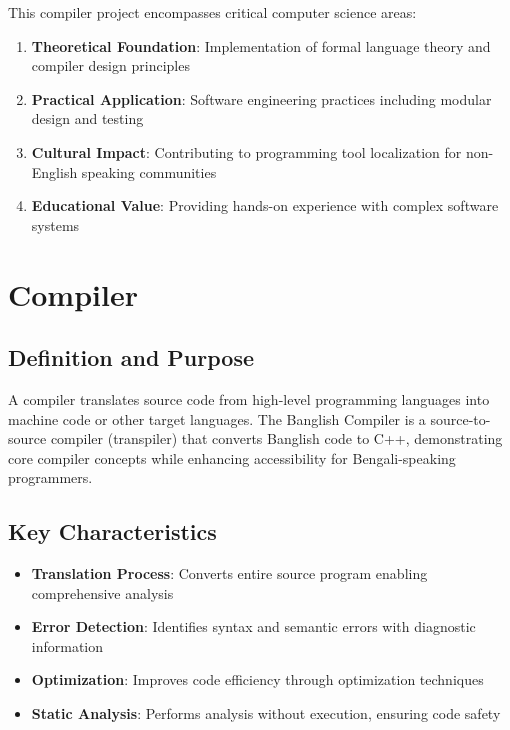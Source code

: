 \documentclass[12pt,a4paper]{article}
\begin{document}
This compiler project encompasses critical computer science areas:

\begin{enumerate}[leftmargin=*,itemsep=3pt]
    \item \textbf{Theoretical Foundation}: Implementation of formal language theory and compiler design principles
    \item \textbf{Practical Application}: Software engineering practices including modular design and testing
    \item \textbf{Cultural Impact}: Contributing to programming tool localization for non-English speaking communities
    \item \textbf{Educational Value}: Providing hands-on experience with complex software systems
\end{enumerate}

\section{Compiler}

\subsection{Definition and Purpose}

A compiler translates source code from high-level programming languages into machine code or other target languages. The Banglish Compiler is a source-to-source compiler (transpiler) that converts Banglish code to C++, demonstrating core compiler concepts while enhancing accessibility for Bengali-speaking programmers.

\subsection{Key Characteristics}

\begin{itemize}[leftmargin=*,itemsep=3pt]
    \item \textbf{Translation Process}: Converts entire source program enabling comprehensive analysis
    \item \textbf{Error Detection}: Identifies syntax and semantic errors with diagnostic information
    \item \textbf{Optimization}: Improves code efficiency through optimization techniques
    \item \textbf{Static Analysis}: Performs analysis without execution, ensuring code safety
\end{itemize}
\end{document}
